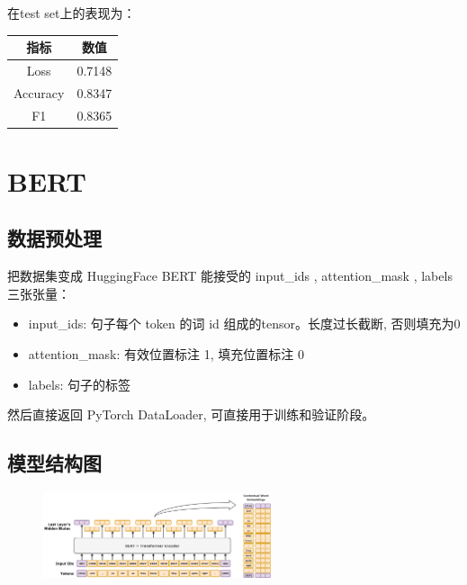 \documentclass{article}
\begin{document}
\FloatBarrier

在test set上的表现为：

\begin{table}[H]
    \centering
    \begin{tabular}{|c|c|}
        \hline 
        {\bf 指标} & {\bf 数值} \\
        \hline
        Loss & 0.7148 \\
        \hline 
        Accuracy & 0.8347 \\
        \hline
        F1 & 0.8365 \\
        \hline
    \end{tabular}
\end{table}

\section{BERT}

\subsection{数据预处理}

把数据集变成 HuggingFace BERT 能接受的 input\_ids , attention\_mask , labels 三张张量：

\begin{itemize}
    \item input\_ids: 句子每个 token 的词 id 组成的tensor。长度过长截断, 否则填充为0
    \item attention\_mask: 有效位置标注 1, 填充位置标注 0
    \item labels: 句子的标签
\end{itemize}

然后直接返回 PyTorch DataLoader, 可直接用于训练和验证阶段。

\subsection{模型结构图}

\begin{figure}[htbp]
    \centering
    \includegraphics[width=0.6\textwidth]{img/bert.png}
\end{figure}
\end{document}

